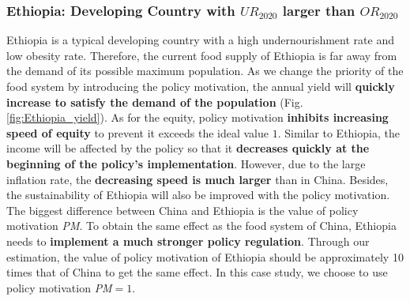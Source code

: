 \documentclass[12pt]{article}
\begin{document}
\subsubsection{Ethiopia: Developing Country with $UR_{2020}$ larger than $OR_{2020}$} 
Ethiopia is a typical developing country with a high undernourishment rate and low obesity rate. Therefore, the current food supply of Ethiopia is far away from the demand of its possible maximum population. As we change the priority of the food system by introducing the policy motivation, the annual yield will \textbf{quickly increase to satisfy the demand of the population} (Fig. \ref{fig:Ethiopia_yield}). As for the equity, policy motivation \textbf{inhibits increasing speed of equity} to prevent it exceeds the ideal value $1$. Similar to Ethiopia, the income will be affected by the policy so that it \textbf{decreases quickly at the beginning of the policy's implementation}. However, due to the large inflation rate, the \textbf{decreasing speed is much larger} than in China. Besides, the sustainability of Ethiopia will also be improved with the policy motivation. The biggest difference between China and Ethiopia is the value of policy motivation \textit{PM}. To obtain the same effect as the food system of China, Ethiopia needs to \textbf{implement a much stronger policy regulation}. Through our estimation, the value of policy motivation of Ethiopia should be approximately 10 times that of China to get the same effect. In this case study, we choose to use policy motivation \textit{PM}$=1$.
\end{document}
